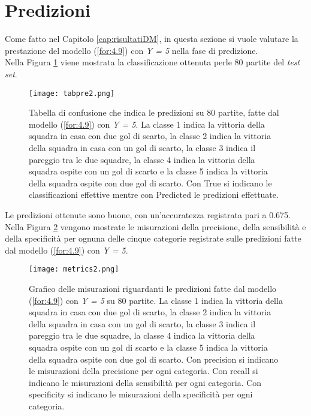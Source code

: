 \section{Predizioni}
Come fatto nel Capitolo \ref{cap:risultatiDM}, in questa sezione si vuole valutare la prestazione del modello (\ref{for:4.9}) con \emph{Y = 5} nella fase di predizione.\\
Nella Figura \ref{fig:pre2} viene mostrata la classificazione ottenuta perle 80 partite del \emph{test set}.
\begin{figure}[h]
	\begin{center}
		\texttt{[image: tabpre2.png]}
		\caption{Tabella di confusione che indica le predizioni su 80 partite, fatte dal modello (\ref{for:4.9}) con \emph{Y = 5}. La classe 1 indica la vittoria della squadra in casa con due gol di scarto, la classe 2 indica la vittoria della squadra in casa con un gol di scarto, la classe 3 indica il pareggio tra le due squadre, la classe 4 indica la vittoria della squadra ospite con un gol di scarto e la classe 5 indica la vittoria della squadra ospite con due gol di scarto. Con \textsf{True} si indicano le classificazioni effettive mentre con \textsf{Predicted} le predizioni effettuate.}\label{fig:pre2}
	\end{center}
\end{figure}
Le predizioni ottenute sono buone, con un'accuratezza registrata pari a 0.675. Nella Figura \ref{fig:metrics} vengono mostrate le misurazioni della precisione, della sensibilità e della specificità per ognuna delle cinque categorie registrate sulle predizioni fatte dal modello (\ref{for:4.9}) con \emph{Y = 5}.
\begin{figure}[]
	\begin{center}
		\texttt{[image: metrics2.png]}
		\caption{Grafico delle misurazioni riguardanti le predizioni fatte dal modello (\ref{for:4.9}) con \emph{Y = 5} su 80 partite. La classe 1 indica la vittoria della squadra in casa con due gol di scarto, la classe 2 indica la vittoria della squadra in casa con un gol di scarto, la classe 3 indica il pareggio tra le due squadre, la classe 4 indica la vittoria della squadra ospite con un gol di scarto e la classe 5 indica la vittoria della squadra ospite con due gol di scarto. Con \textsf{precision} si indicano le misurazioni della precisione per ogni categoria. Con \textsf{recall} si indicano le misurazioni della sensibilità per ogni categoria. Con \textsf{specificity} si indicano le misurazioni della specificità per ogni categoria.}\label{fig:metrics}
	\end{center}
\end{figure}
